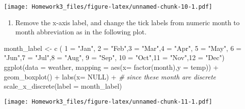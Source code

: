\documentclass[
]{article}
\newenvironment{Shaded}{\begin{snugshade}}{\end{snugshade}}
\newcommand{\AttributeTok}[1]{\textcolor[rgb]{0.77,0.63,0.00}{#1}}
\newcommand{\CommentTok}[1]{\textcolor[rgb]{0.56,0.35,0.01}{\textit{#1}}}
\newcommand{\ConstantTok}[1]{\textcolor[rgb]{0.00,0.00,0.00}{#1}}
\newcommand{\FunctionTok}[1]{\textcolor[rgb]{0.00,0.00,0.00}{#1}}
\newcommand{\NormalTok}[1]{#1}
\newcommand{\OtherTok}[1]{\textcolor[rgb]{0.56,0.35,0.01}{#1}}
\newcommand{\SpecialCharTok}[1]{\textcolor[rgb]{0.00,0.00,0.00}{#1}}
\newcommand{\StringTok}[1]{\textcolor[rgb]{0.31,0.60,0.02}{#1}}
\providecommand{\tightlist}{%
  \setlength{\itemsep}{0pt}\setlength{\parskip}{0pt}}
\begin{document}
\texttt{[image: Homework3\_files/figure-latex/unnamed-chunk-10-1.pdf]}

\begin{enumerate}
\def\labelenumi{\alph{enumi}.}
\tightlist
\item
  Remove the x-axis label, and change the tick labels from numeric month
  to month abbreviation as in the following plot.
\end{enumerate}

\begin{Shaded}
\begin{Highlighting}[]
\NormalTok{month\_label }\OtherTok{\textless{}{-}} \FunctionTok{c}\NormalTok{ (}
                \StringTok{\textquotesingle{}1\textquotesingle{}} \OtherTok{=} \StringTok{"Jan"}\NormalTok{, }\StringTok{\textquotesingle{}2\textquotesingle{}} \OtherTok{=} \StringTok{"Feb"}\NormalTok{,}\StringTok{\textquotesingle{}3\textquotesingle{}} \OtherTok{=} \StringTok{"Mar"}\NormalTok{,}\StringTok{\textquotesingle{}4\textquotesingle{}} \OtherTok{=} \StringTok{"Apr"}\NormalTok{,}
                \StringTok{\textquotesingle{}5\textquotesingle{}} \OtherTok{=} \StringTok{"May"}\NormalTok{, }\StringTok{\textquotesingle{}6\textquotesingle{}} \OtherTok{=} \StringTok{"Jun"}\NormalTok{,}\StringTok{\textquotesingle{}7\textquotesingle{}} \OtherTok{=} \StringTok{"Jul"}\NormalTok{,}\StringTok{\textquotesingle{}8\textquotesingle{}} \OtherTok{=} \StringTok{"Aug"}\NormalTok{,}
                \StringTok{\textquotesingle{}9\textquotesingle{}} \OtherTok{=} \StringTok{"Sep"}\NormalTok{, }\StringTok{\textquotesingle{}10\textquotesingle{}} \OtherTok{=} \StringTok{"Oct"}\NormalTok{,}\StringTok{\textquotesingle{}11\textquotesingle{}} \OtherTok{=} \StringTok{"Nov"}\NormalTok{,}\StringTok{\textquotesingle{}12\textquotesingle{}} \OtherTok{=} \StringTok{"Dec"}\NormalTok{)}
\FunctionTok{ggplot}\NormalTok{(}\AttributeTok{data =}\NormalTok{ weather, }\AttributeTok{mapping =} \FunctionTok{aes}\NormalTok{(}\AttributeTok{x=} \FunctionTok{factor}\NormalTok{(month),}\AttributeTok{y =}\NormalTok{ temp)) }\SpecialCharTok{+}
  \FunctionTok{geom\_boxplot}\NormalTok{() }\SpecialCharTok{+} 
  \FunctionTok{labs}\NormalTok{(}\AttributeTok{x=} \ConstantTok{NULL}\NormalTok{) }\SpecialCharTok{+} 
  \CommentTok{\# since these month are discrete}
  \FunctionTok{scale\_x\_discrete}\NormalTok{(}\AttributeTok{label =}\NormalTok{ month\_label) }
\end{Highlighting}
\end{Shaded}

\texttt{[image: Homework3\_files/figure-latex/unnamed-chunk-11-1.pdf]}
\end{document}

